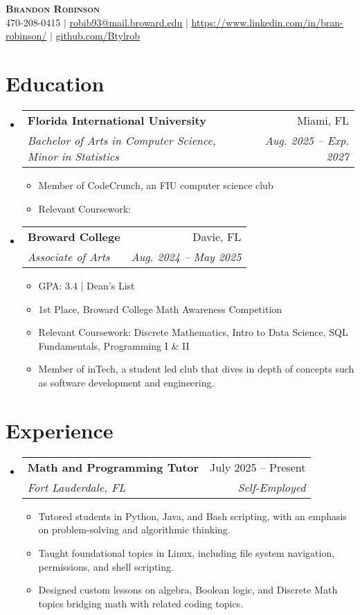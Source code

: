 \documentclass[letterpaper,11pt]{article}
\makeatletter
\newcommand{\resumeItem}[1]{
  \item\small{
    {#1 \vspace{-2pt}}
  }
}
\newcommand{\resumeSubheading}[4]{
  \vspace{-2pt}\item
    \begin{tabular*}{0.97\textwidth}[t]{l@{\extracolsep{\fill}}r}
      \textbf{#1} & #2 \\
      \textit{\small#3} & \textit{\small #4} \\
    \end{tabular*}\vspace{-7pt}
}
\newcommand{\resumeSubHeadingListStart}{\begin{itemize}[leftmargin=0.15in, label={}]}
\newcommand{\resumeSubHeadingListEnd}{\end{itemize}}
\newcommand{\resumeItemListStart}{\begin{itemize}}
\newcommand{\resumeItemListEnd}{\end{itemize}\vspace{-5pt}}
\makeatother
\begin{document}

\begin{center}
    \textbf{\Huge \scshape Brandon Robinson} \\ \vspace{1pt}
    \small 470-208-0415 $|$ \href{mailto:x@x.com}{\underline{robib93@mail.broward.edu}} $|$ 
    \href{https://linkedin.com/in/...}{\underline{https://www.linkedin.com/in/bran-robinson/}} $|$
    \href{https://github.com/...}{\underline{github.com/Btylrob}}
\end{center}


\section{Education}
  \resumeSubHeadingListStart
    \resumeSubheading
      {Florida International University}{Miami, FL}
      {Bachelor of Arts in Computer Science, Minor in Statistics}{Aug. 2025 -- Exp. 2027}
       \resumeItemListStart
        \resumeItem{Member of CodeCrunch, an FIU computer science club}
        \resumeItem{Relevant Coursework: }
      \resumeItemListEnd
    \resumeSubheading
      {Broward College}{Davie, FL}
      {Associate of Arts}{Aug. 2024 -- May 2025}
      \resumeItemListStart
        \resumeItem{GPA: 3.4 | Dean’s List}
        \resumeItem{1st Place, Broward College Math Awareness Competition}
        \resumeItem{Relevant Coursework: Discrete Mathematics, Intro to Data Science, SQL
        Fundamentals, Programming I \& II}
        \resumeItem{Member of inTech, a student led club that dives in depth of concepts such as software development and engineering.}
      \resumeItemListEnd
  \resumeSubHeadingListEnd


\section{Experience}
  \resumeSubHeadingListStart
    \resumeSubheading
      {Math and Programming Tutor}{July 2025 -- Present}
      {Fort Lauderdale, FL}{Self-Employed}
      \resumeItemListStart
        \resumeItem{Tutored students in Python, Java, and Bash scripting, with an emphasis on problem-solving and algorithmic thinking.}
        \resumeItem{Taught foundational topics in Linux, including file system navigation, permissions, and shell scripting.}
        \resumeItem{Designed custom lessons on algebra, Boolean logic, and Discrete Math topics bridging math with related coding topics.}
      \resumeItemListEnd
  \resumeSubHeadingListEnd
\end{document}
